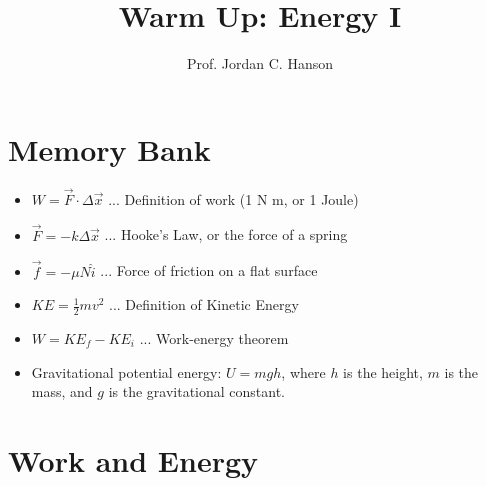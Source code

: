 \documentclass{article}
\begin{document}
\twocolumn

\title{Warm Up: Energy I}
\author{Prof. Jordan C. Hanson}

\maketitle

\section{Memory Bank}

\begin{itemize}
\item $W = \vec{F} \cdot \Delta \vec{x}$ ... Definition of work (1 N m, or 1 Joule)
\item $\vec{F} = -k\Delta \vec{x}$ ... Hooke's Law, or the force of a spring
\item $\vec{f} = -\mu N \hat{i}$ ... Force of friction on a flat surface
\item $KE = \frac{1}{2}m v^2$ ... Definition of Kinetic Energy
\item $W = KE_f - KE_i$ ... Work-energy theorem
\item Gravitational potential energy: $U = mgh$, where $h$ is the height, $m$ is the mass, and $g$ is the gravitational constant.
\end{itemize}

\section{Work and Energy}
\end{document}
